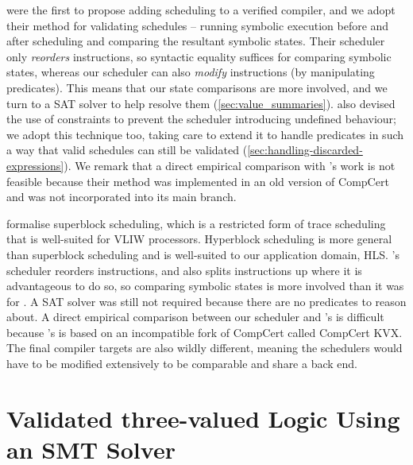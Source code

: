 {\textcite{tristan08_formal_verif_trans_valid} were the first to propose adding
scheduling to a verified compiler, and we adopt their method for validating
schedules -- running symbolic execution before and after scheduling and
comparing the resultant symbolic states. Their scheduler only \emph{reorders}
instructions, so syntactic equality suffices for comparing symbolic states,
whereas our scheduler can also \emph{modify} instructions (by manipulating
predicates). This means that our state comparisons are more involved, and we
turn to a SAT solver to help resolve them (\cref{sec:value_summaries}).
\citeauthor{tristan08_formal_verif_trans_valid} also devised the use of
constraints to prevent the scheduler introducing undefined behaviour; we adopt
this technique too, taking care to extend it to handle predicates in such a way
that valid schedules can still be validated
(\cref{sec:handling-discarded-expressions}). We remark that a direct empirical
comparison with \citeauthor{tristan08_formal_verif_trans_valid}'s work is not
feasible because their method was implemented in an old version of CompCert and
was not incorporated into its main branch.

\textcite{six22_formal_verif_super_sched} formalise superblock scheduling, which
is a restricted form of trace scheduling that is well-suited for VLIW
processors.  Hyperblock scheduling is more general than superblock scheduling
and is well-suited to our application domain,
HLS. \citeauthor{six22_formal_verif_super_sched}'s scheduler reorders
instructions, and also splits instructions up where it is advantageous to do so,
so comparing symbolic states is more involved than it was for
\citeauthor{tristan08_formal_verif_trans_valid}.  A SAT solver was still not
required because there are no predicates to reason about. A direct empirical
comparison between our scheduler and
\citeauthor{six22_formal_verif_super_sched}'s is difficult because
\citeauthor{six22_formal_verif_super_sched}'s is based on an incompatible fork
of CompCert called CompCert KVX.  The final compiler targets are also wildly
different, meaning the schedulers would have to be modified extensively to be
comparable and share a back end.

\section{Validated three-valued Logic Using an SMT Solver}%
\label{sec:hs:efficient-smt-solver-validation}

}
